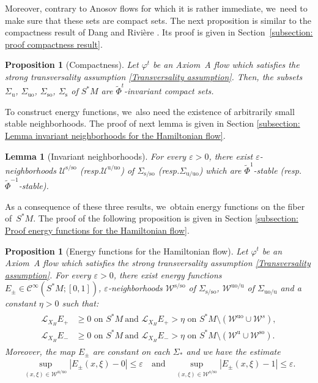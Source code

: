 \documentclass[11pt]{article}
\newcommand{\resp}{resp.\xspace}
\newcommand{\skpt}{\smallskip}
\newcommand{\rs}{\mathrm{s}}
\newcommand{\rso}{\mathrm{so}}
\newcommand{\ru}{\mathrm{u}}
\newcommand{\ruo}{\mathrm{uo}}
\theoremstyle{definition}
\theoremstyle{plain}
\newtheorem{prop}[definition]{Proposition}
\newtheorem{lemma}[definition]{Lemma}
\newcommand{\Ccal}{\mathcal{C}}
\newcommand{\Lie}{\mathcal{L}}
\newcommand{\Ucal}{\mathcal{U}}
\newcommand{\Wcal}{\mathcal{W}}
\begin{document}
Moreover, contrary to Anosov flows for which it is rather immediate, we~need to make sure that these sets are compact sets. The next proposition is similar to the compactness result of Dang and Rivière \cite[Lem.\,3.7, p.\,15]{DR0}. Its proof is given in Section~\ref{subsection: proof compactness result}.

\begin{prop}[Compactness]\label{prop compactness}Let $\varphi^t$ be an Axiom~A flow which satisfies the strong transversality assumption \eqref{Transversality assumption}. Then, the subsets
$\Sigma_{\ru}$, $\Sigma_{\ruo}$, $\Sigma_{\rso}$, $\Sigma_{\rs}$ of $S^*M$ are $\widetilde{\Phi}^t$-invariant compact sets.
\end{prop}

To construct energy functions, we~also need the existence of arbitrarily small stable neighborhoods. The proof of next lemma is given in Section  \ref{subsection: Lemma invariant neighborhoods for the Hamiltonian flow}.

\begin{lemma}[Invariant neighborhoods]\label{lemma invariant neighborhoods}
For every $\varepsilon > 0$, there exist $\varepsilon$-neighborhoods $\Ucal^{\rs/\rso}$ (\resp $\Ucal^{\ru/\ruo}$) of $\Sigma_{\rs/\rso}$ (\resp $\Sigma_{\ru/\ruo}$) which are $\widetilde{\Phi}^{1}$-stable (\resp $\widetilde{\Phi}^{-1}$-stable).
\end{lemma}

As a consequence of these three results, we~obtain energy functions on the fiber of~$S^* M$. The proof of the following proposition is given in Section \ref{subsection: Proof energy functions for the Hamiltonian flow}.

\skpt
\begin{prop}[Energy functions for the Hamiltonian flow]\label{prop energy function on the unitary cotangent bundle}
Let $\varphi^t$ be an Axiom~A flow which satisfies the strong transversality assumption \eqref{Transversality assumption}. For every $\varepsilon > 0$, there exist energy functions $E_{\pm} \in \Ccal^{\infty}(S^* M; [0,1])$, $\varepsilon$\nobreakdash-neighborhoods $\Wcal^{\rs/\rso}$ of $\Sigma_{\rs/\rso}$, $\Wcal^{\ruo/\ru}$ of $\Sigma_{\ruo/\ru}$ and a constant $\eta > 0$ such that:
\begin{align*}
\begin{split}
\Lie_{X_H} E_{+} &\geq 0 \text{ on } S^* M \: \text{and } \Lie_{X_H} E_{+} > \eta \text{ on } S^* M \setminus (\Wcal^{\ruo} \cup \Wcal^{s}), \\
\Lie_{X_H} E_{-} &\geq 0 \text{ on } S^* M \: \text{and } \Lie_{X_H} E_{-} > \eta \text{ on } S^* M \setminus (\Wcal^{\ru} \cup \Wcal^{\rso}).
\end{split}
\end{align*}
Moreover, the map $E_{\pm}$ are constant on each $\Sigma_{*}$ and we have the estimate
\begin{align*}
\sup_{(x,\xi) \in \Wcal^{\ru/\ruo}} \left| E_{\pm}(x,\xi) - 0 \right| \leq \varepsilon \quad \text{and} \quad \sup_{(x,\xi) \in \Wcal^{\rs/\rso}} \left| E_{\pm}(x,\xi) - 1 \right| \leq \varepsilon.
\end{align*}
\end{prop}
\end{document}
